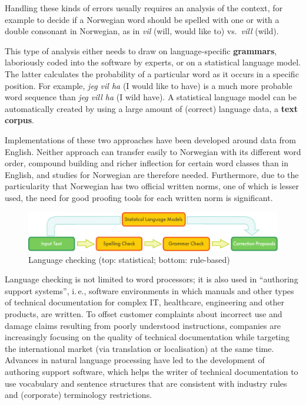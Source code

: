 \begin{multicols}{2}
Handling these kinds of errors usually requires an analysis of the context, for example to decide if a Norwegian word should be spelled with one or with a double consonant in Norwegian, as in \textit{vil} (will, would like to) vs.~\textit{vill} (wild).

This type of analysis either needs to draw on language-specific \textbf{grammars}, laboriously coded into the software by experts, or on a statistical language model. The latter calculates the probability of a particular word as it occurs in a specific position. For example, \textit{jeg vil ha} (I would like to have) is a much more probable word sequence than \textit{jeg vill ha} (I wild have). A statistical language model can be automatically created by using a large amount of (correct) language data, a \textbf{text corpus}.

Implementations of these two approaches have been developed around data from English. Neither approach can transfer easily to Norwegian with its different word order, compound building and richer inflection for certain word classes than in English, and studies for Norwegian are therefore needed. Furthermore, due to the particularity that Norwegian has two official written norms, one of which is lesser used, the need for good proofing tools for each written norm is significant. 

\begin{figure}[htb]
  \center
  \includegraphics[width=\textwidth]{../_media/english/language_checking}
  \caption{Language checking (top: statistical; bottom: rule-based)}
  \label{fig:langcheckingaarch_en}
\end{figure}

Language checking is not limited to word processors; it is also used in “authoring support systems”, i.\,e., software environments in which manuals and other types of technical documentation for complex IT, healthcare, engineering and other products, are written. To offset customer complaints about incorrect use and damage claims resulting from poorly understood instructions, companies are increasingly focusing on the quality of technical documentation while targeting the international market (via translation or localisation) at the same time. Advances in natural language processing have led to the development of authoring support software, which helps the writer of technical documentation to use vocabulary and sentence structures that are consistent with industry rules and (corporate) terminology restrictions.


\end{multicols}
